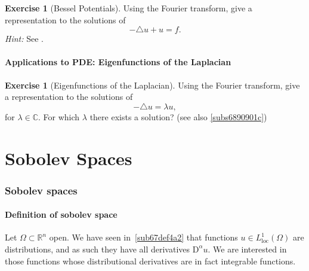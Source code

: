 \documentclass[a4paper,9pt]{amsart}
\newcommand{\R}{\mathbb{R}}	%
\newcommand{\C}{\mathbb{C}}	%
\newcommand{\Diff}{\mathrm{D}}
\newcommand{\loc}{\mathrm{loc}}
\newcommand{\laplacian}{\triangle}
\newcommand{\TODO}{{\bf\color{Red}TODO}}
\theoremstyle{plain}
\theoremstyle{definition}
\newtheorem{exercise}[proposition]{Exercise}%
\theoremstyle{remark}
\begin{document}
%

\begin{exercise}[Bessel Potentials]
	Using the Fourier transform, give a representation to the solutions of 
	\begin{equation}
		-\laplacian u + u = f .
	\end{equation}
	{\it Hint:}
	See \cite[\S4.3,p.191]{MR2597943}.
\end{exercise}

\subsection{Applications to PDE: Eigenfunctions of the Laplacian}
%

\begin{exercise}[Eigenfunctions of the Laplacian]
	Using the Fourier transform, give a representation to the solutions of
	\begin{equation}
		-\laplacian u = \lambda u ,
	\end{equation}
	for $\lambda\in\C$.
	For which $\lambda$ there exists a solution? 
	(see also \ref{subs6890901c})
\end{exercise}


\newpage
\part{Sobolev Spaces}




\section{Sobolev spaces}

\subsection{Definition of sobolev space}
Let $\Omega\subset\R^n$ open.
We have seen in~\ref{sub67def4a2} that functions $u\in L^1_\loc(\Omega)$ are distributions, and as such they have all derivatives $\Diff^\alpha u$.
We are interested in those functions whose distributional derivatives are in fact integrable functions.
\end{document}

